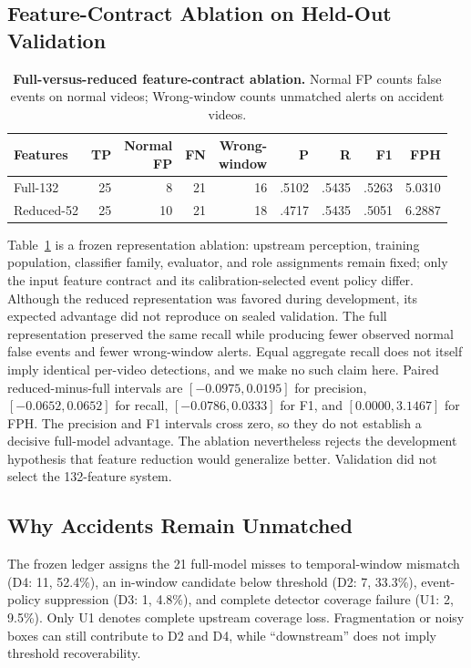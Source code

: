 \documentclass[letterpaper]{article}
\begin{document}
\subsection{Feature-Contract Ablation on Held-Out Validation}
\begin{table}[t]
\centering
\scriptsize
\setlength{\tabcolsep}{1.7pt}
\caption{\textbf{Full-versus-reduced feature-contract ablation.} Normal FP counts false events on normal videos; Wrong-window counts unmatched alerts on accident videos.}
\label{tab:primary-validation}
\begin{tabular}{lrrrrrrrr}
\toprule
Features & TP & \shortstack{Normal\\FP} & FN & \shortstack{Wrong-\\window} & P & R & F1 & FPH \\
\midrule
Full-132 & 25 & 8 & 21 & 16 & .5102 & .5435 & .5263 & 5.0310 \\
Reduced-52 & 25 & 10 & 21 & 18 & .4717 & .5435 & .5051 & 6.2887 \\
\bottomrule
\end{tabular}
\end{table}

Table~\ref{tab:primary-validation} is a frozen representation ablation: upstream perception, training population, classifier family, evaluator, and role assignments remain fixed; only the input feature contract and its calibration-selected event policy differ. Although the reduced representation was favored during development, its expected advantage did not reproduce on sealed validation. The full representation preserved the same recall while producing fewer observed normal false events and fewer wrong-window alerts. Equal aggregate recall does not itself imply identical per-video detections, and we make no such claim here. Paired reduced-minus-full intervals are $[-0.0975,0.0195]$ for precision, $[-0.0652,0.0652]$ for recall, $[-0.0786,0.0333]$ for F1, and $[0.0000,3.1467]$ for FPH. The precision and F1 intervals cross zero, so they do not establish a decisive full-model advantage. The ablation nevertheless rejects the development hypothesis that feature reduction would generalize better. Validation did not select the 132-feature system.

\subsection{Why Accidents Remain Unmatched}
The frozen ledger assigns the 21 full-model misses to temporal-window mismatch (D4: 11, 52.4\%), an in-window candidate below threshold (D2: 7, 33.3\%), event-policy suppression (D3: 1, 4.8\%), and complete detector coverage failure (U1: 2, 9.5\%). Only U1 denotes complete upstream coverage loss. Fragmentation or noisy boxes can still contribute to D2 and D4, while ``downstream'' does not imply threshold recoverability.
\end{document}
